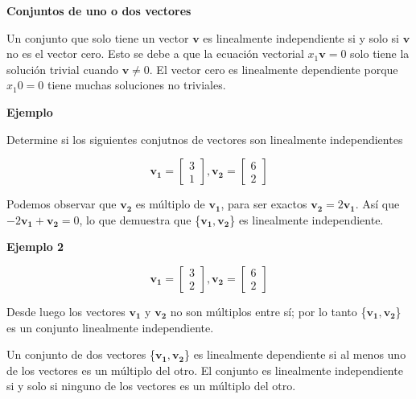 \documentclass{article}
\begin{document}
\begin{large}
    \textbf{Conjuntos de uno o dos vectores}
\end{large}

Un conjunto que solo tiene un vector $\mathbf{v}$ es linealmente independiente si y solo si $\mathbf{v}$ no es el vector cero. Esto se debe a que la ecuación vectorial $x_1\mathbf{v} = 0$ solo tiene la solución trivial cuando $\mathbf{v} \neq 0$. El vector cero es linealmente dependiente porque $x_{1}0=0$
tiene muchas soluciones no triviales.

\begin{large}
    \textbf{Ejemplo}
\end{large}

Determine si los siguientes conjutnos de vectores son linealmente independientes

\begin{equation*}
    \mathbf{v_1} = \begin{bmatrix} 3\\1  \end{bmatrix},
    \mathbf{v_2} = \begin{bmatrix} 6\\2  \end{bmatrix}
\end{equation*}

Podemos observar que $\mathbf{v_2}$ es múltiplo de $\mathbf{v_1}$, para ser exactos $\mathbf{v_2} = 2\mathbf{v_1}$. Así que $-2\mathbf{v_1} + \mathbf{v_2}= 0$, lo que demuestra que \{$\mathbf{v_1}, \mathbf{v_2}$\} es linealmente independiente.

\begin{large}
    \textbf{Ejemplo 2}
\end{large}

\begin{equation*}
    \mathbf{v_1} = \begin{bmatrix} 3\\2  \end{bmatrix},
    \mathbf{v_2} = \begin{bmatrix} 6\\2  \end{bmatrix}
\end{equation*}

Desde luego los vectores $\mathbf{v_1}$ y $\mathbf{v_2}$ no son múltiplos entre sí; por lo tanto \{$\mathbf{v_1}, \mathbf{v_2}$\} es un conjunto linealmente independiente.

\begin{tcolorbox}[colback=red!10!white, colframe=red!70!black, title=Conjunto de 2 vectores]
    Un conjunto de dos vectores \{$\mathbf{v_1}, \mathbf{v_2}$\} es linealmente dependiente si al menos uno de los vectores es un múltiplo del otro. El conjunto es linealmente independiente si y solo si ninguno de los vectores es un múltiplo del otro.
\end{tcolorbox}
\end{document}
